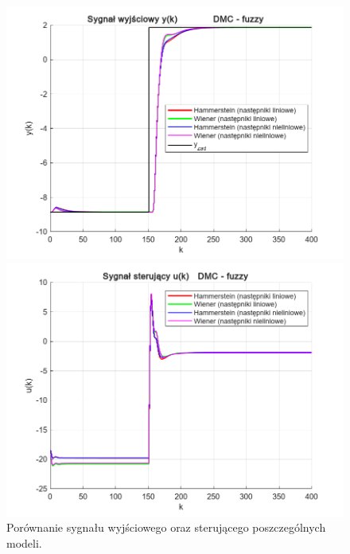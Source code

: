 \documentclass[a4paper,titlepage,11pt,floatssmall]{mwrep}
\begin{document}
\begin{figure}[p]
\centering
\begin{minipage}{0.495\linewidth}
    \centering
    \includegraphics[width=1.1\linewidth]{pictures/DMC_fuzzy_y}
\end{minipage}
\hfill
\begin{minipage}{0.495\linewidth}
    \centering
    \includegraphics[width=1.1\linewidth]{pictures/DMC_fuzzy_u}
\end{minipage}

\caption{Porównanie sygnału wyjściowego oraz sterującego poszczególnych modeli.}

\vspace{2cm} 


\end{figure}
\end{document}

